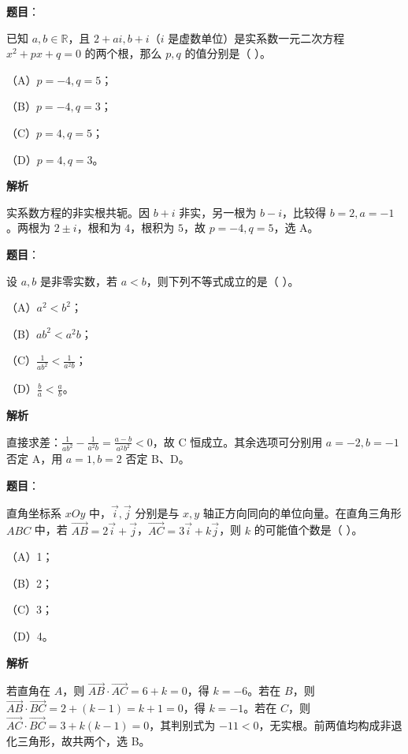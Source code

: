 \begin{answer}

\textbf{题目}：

已知 $a,b\in\mathbb R$，且 $2+ai,b+i$（$i$ 是虚数单位）是实系数一元二次方程 $x^2+px+q=0$ 的两个根，那么 $p,q$ 的值分别是（ ）。

（A）$p=-4,q=5$；

（B）$p=-4,q=3$；

（C）$p=4,q=5$；

（D）$p=4,q=3$。

\textbf{解析}

实系数方程的非实根共轭。因 $b+i$ 非实，另一根为 $b-i$，比较得 $b=2,a=-1$。两根为 $2\pm i$，根和为 $4$，根积为 $5$，故 $p=-4,q=5$，选 A。


\end{answer}
\begin{answer}

\textbf{题目}：

设 $a,b$ 是非零实数，若 $a<b$，则下列不等式成立的是（ ）。

（A）$a^2<b^2$；

（B）$ab^2<a^2b$；

（C）$\frac1{ab^2}<\frac1{a^2b}$；

（D）$\frac ba<\frac ab$。

\textbf{解析}

直接求差：$\frac1{ab^2}-\frac1{a^2b}=\frac{a-b}{a^2b^2}<0$，故 C 恒成立。其余选项可分别用 $a=-2,b=-1$ 否定 A，用 $a=1,b=2$ 否定 B、D。


\end{answer}
\begin{answer}

\textbf{题目}：

直角坐标系 $xOy$ 中，$\vec i,\vec j$ 分别是与 $x,y$ 轴正方向同向的单位向量。在直角三角形 $ABC$ 中，若 $\overrightarrow{AB}=2\vec i+\vec j$，$\overrightarrow{AC}=3\vec i+k\vec j$，则 $k$ 的可能值个数是（ ）。

（A）1；

（B）2；

（C）3；

（D）4。

\textbf{解析}

若直角在 $A$，则 $\overrightarrow{AB}\cdot\overrightarrow{AC}=6+k=0$，得 $k=-6$。若在 $B$，则 $\overrightarrow{AB}\cdot\overrightarrow{BC}=2+(k-1)=k+1=0$，得 $k=-1$。若在 $C$，则 $\overrightarrow{AC}\cdot\overrightarrow{BC}=3+k(k-1)=0$，其判别式为 $-11<0$，无实根。前两值均构成非退化三角形，故共两个，选 B。


\end{answer}
